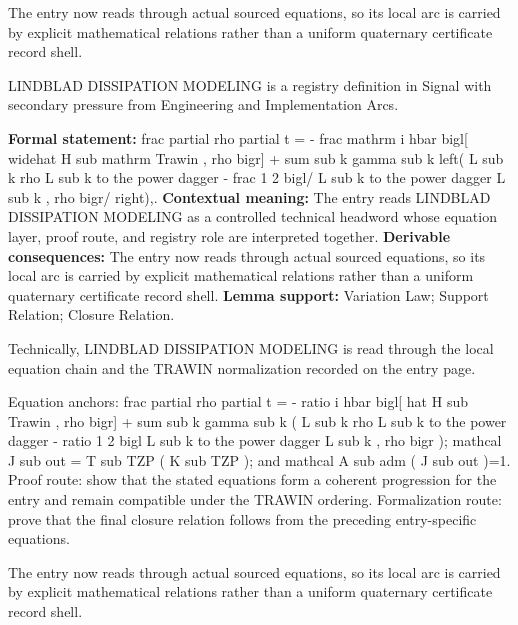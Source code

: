 The entry now reads through actual sourced equations, so its local arc is carried by explicit mathematical relations rather than a uniform quaternary certificate record shell.
\clearpage


\begingroup\small
{}
LINDBLAD DISSIPATION MODELING is a registry definition in Signal with secondary pressure from Engineering and Implementation Arcs.

\begingroup\footnotesize\setlength{\emergencystretch}{3em}\sloppy
\textbf{Formal statement:} frac partial rho partial t = - frac mathrm i hbar bigl[ widehat H sub mathrm Trawin , rho bigr] + sum sub k gamma sub k left( L sub k rho L sub k to the power dagger - frac 1 2 bigl/ L sub k to the power dagger L sub k , rho bigr/ right),. \textbf{Contextual meaning:} The entry reads LINDBLAD DISSIPATION MODELING as a controlled technical headword whose equation layer, proof route, and registry role are interpreted together. \textbf{Derivable consequences:} The entry now reads through actual sourced equations, so its local arc is carried by explicit mathematical relations rather than a uniform quaternary certificate record shell. \textbf{Lemma support:} Variation Law; Support Relation; Closure Relation.\par
\endgroup

Technically, LINDBLAD DISSIPATION MODELING is read through the local equation chain and the TRAWIN normalization recorded on the entry page.

Equation anchors: frac partial rho partial t = - ratio i hbar bigl[ hat H sub Trawin , rho bigr] + sum sub k gamma sub k ( L sub k rho L sub k to the power dagger - ratio 1 2 bigl L sub k to the power dagger L sub k , rho bigr ); mathcal J sub out = T sub TZP ( K sub TZP ); and mathcal A sub adm ( J sub out )=1. Proof route: show that the stated equations form a coherent progression for the entry and remain compatible under the TRAWIN ordering. Formalization route: prove that the final closure relation follows from the preceding entry-specific equations.

The entry now reads through actual sourced equations, so its local arc is carried by explicit mathematical relations rather than a uniform quaternary certificate record shell.
\endgroup

